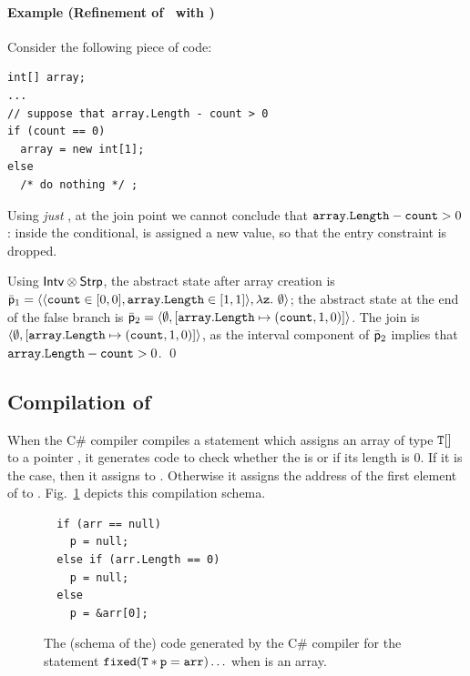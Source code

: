 \documentclass[10pt]{sigplanconf}
\begin{document}
\paragraph{Example (Refinement of \Stripes\ with \Intervals)}
Consider the following piece of code:

\begin{lstlisting}[frame=lines]
int[] array;
...
// suppose that array.Length - count > 0
if (count == 0)
  array = new int[1];
else 
  /* do nothing */ ;
\end{lstlisting}
Using \emph{just} \Stripes, at the join point we cannot conclude that $\mathtt{array.Length} - \mathtt{count} > 0$: inside the conditional,  is assigned a new value, so that the entry constraint is dropped.

Using $\mathsf{Intv} \otimes \mathsf{Strp}$, the abstract state after array creation is $\ael{p}_1 = \tupla{\tupla{\code{count} \in [0,0],\allowbreak \code{array.Length}\in [1,1]}, \lambda \var{z}.\ \emptyset}$; the abstract state at the end of the false branch is $\bar{\mathsf{p}}_2 = \langle \emptyset,  [\mathtt{array.Length} \mapsto (\mathtt{count}, 1, 0) ] \rangle$.
The join is $\langle \emptyset, \allowbreak [\mathtt{array.\allowbreak Length\allowbreak} \mapsto (\mathtt{count}, 1, 0) ] \rangle$, as the interval component of $\bar{\mathsf{p}}_2$ implies that $\mathtt{array.Length} - \mathtt{count} > 0$.
\qed



\subsection{Compilation  of }
When the C\# compiler compiles a  statement which assigns
an array  of type $\mathtt{T}[]$ to a pointer , it
generates code to check whether the  is  or if
its length is 0.  If it is the case, then it assigns  to
.  Otherwise it assigns the address of the first element of
 to .  Fig.~\ref{fig:fixed} depicts this compilation
schema.

\begin{figure}[b]
\begin{lstlisting}
  if (arr == null)
    p = null;
  else if (arr.Length == 0)
    p = null;
  else 
    p = &arr[0];
\end{lstlisting}
\caption{The (schema of the) code generated by the C\# compiler for the statement $\mathtt{fixed(T* p = arr) \dots }$ when  is an array.}
\label{fig:fixed}
\end{figure}
\end{document}
